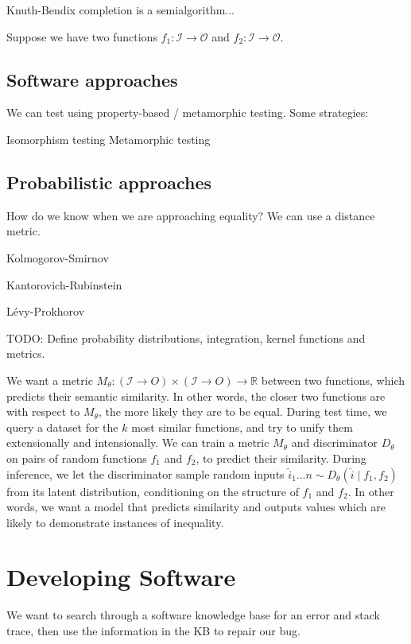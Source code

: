 \documentclass[11pt]{article}
\begin{document}
    Knuth-Bendix completion is a semialgorithm...

    Suppose we have two functions $f_1: \mathcal{I} \rightarrow \mathcal{O}$ and $f_2: \mathcal{I}\rightarrow \mathcal{O}$.


    \subsection{Software approaches}

    We can test using property-based / metamorphic testing. Some strategies:

    Isomorphism testing
    Metamorphic testing

    \subsection{Probabilistic approaches}

    How do we know when we are approaching equality? We can use a distance metric.

    Kolmogorov-Smirnov

    Kantorovich-Rubinstein

    L\'evy-Prokhorov

    TODO: Define probability distributions, integration, kernel functions and metrics.

    We want a metric $M_\theta: (\mathcal{I}\rightarrow{O}) \times (\mathcal{I}\rightarrow{O})\rightarrow \mathbb{R}$ between two functions, which predicts their semantic similarity. In other words, the closer two functions are with respect to $M_\theta$, the more likely they are to be equal. During test time, we query a dataset for the $k$ most similar functions, and try to unify them extensionally and intensionally. We can train a metric $M_\theta$ and discriminator $D_\theta$ on pairs of random functions $f_1$ and $f_2$, to predict their similarity. During inference, we let the discriminator sample random inputs $\hat i_1 \ldots n \sim D_\theta(\hat i \mid f_1, f_2)$ from its latent distribution, conditioning on the structure of $f_1$ and $f_2$. In other words, we want a model that predicts similarity and outputs values which are likely to demonstrate instances of inequality.

    \section{Developing Software}\label{sec:applications}

    We want to search through a software knowledge base for an error and stack trace, then use the information in the KB to repair our bug.
\end{document}
